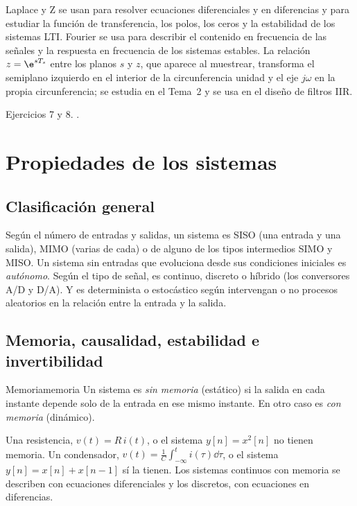 \documentclass[11pt,a4paper]{scrartcl}
\begin{document}
Laplace y Z se usan para resolver ecuaciones diferenciales y en diferencias y para estudiar la función de transferencia, los polos, los ceros y la estabilidad de los sistemas LTI. Fourier se usa para describir el contenido en frecuencia de las señales y la respuesta en frecuencia de los sistemas estables. La relación $z=\e^{sT_s}$ entre los planos $s$ y $z$, que aparece al muestrear, transforma el semiplano izquierdo en el interior de la circunferencia unidad y el eje $j\omega$ en la propia circunferencia; se estudia en el Tema~2 y se usa en el diseño de filtros IIR.

\begin{flushright}\small\color{pdsgris}Ejercicios 7 y 8. .\end{flushright}

\section{Propiedades de los sistemas}\label{sec:propiedades}

\subsection{Clasificación general}

Según el número de entradas y salidas, un sistema es SISO (una entrada y una salida), MIMO (varias de cada) o de alguno de los tipos intermedios SIMO y MISO. Un sistema sin entradas que evoluciona desde sus condiciones iniciales es \emph{autónomo}. Según el tipo de señal, es continuo, discreto o híbrido (los conversores A/D y D/A). Y es determinista o estocástico según intervengan o no procesos aleatorios en la relación entre la entrada y la salida.

\subsection{Memoria, causalidad, estabilidad e invertibilidad}

\begin{definicion}{Memoria}{memoria}
  Un sistema es \emph{sin memoria} (estático) si la salida en cada instante depende solo de la entrada en ese mismo instante. En otro caso es \emph{con memoria} (dinámico).
\end{definicion}

Una resistencia, $v(t)=R\,i(t)$, o el sistema $y[n]=x^2[n]$ no tienen memoria. Un condensador, $v(t)=\frac1C\int_{-\infty}^{t}i(\tau)\dd\tau$, o el sistema $y[n]=x[n]+x[n-1]$ sí la tienen. Los sistemas continuos con memoria se describen con ecuaciones diferenciales y los discretos, con ecuaciones en diferencias.
\end{document}
